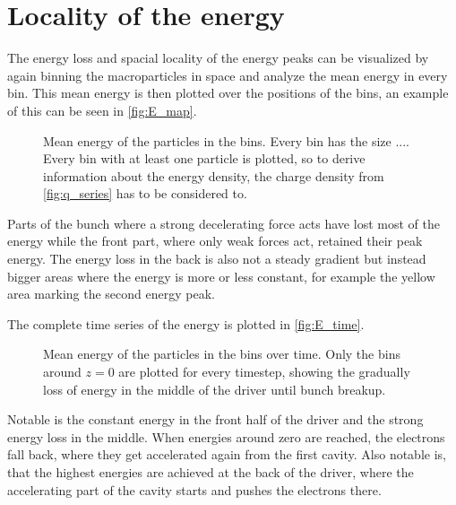 \documentclass[bachelor_thesis]{subfiles}
\begin{document}
\section{Locality of the energy}\label{chap:loc_E}
The energy loss and spacial locality of the energy peaks can be visualized by again binning the macroparticles in space and analyze the mean energy in every bin. This mean energy is then plotted over the positions of the bins,
an example of this can be seen in \autoref{fig:E_map}. 
\begin{figure}
	\centering
	\missingfigure{}
	\caption{Mean energy of the particles in the bins. Every bin has the size .... Every bin with at least one particle is plotted, so to derive information about the energy density, the charge density from \autoref{fig:q_series} has to be considered to.}
	\label{fig:E_map}
\end{figure}

Parts of the bunch where a strong decelerating force acts have lost most of the energy while the front part, where only weak forces act, retained their peak energy. The energy loss in the back is also not a steady gradient but instead bigger areas where the energy is more or less constant, 
for example the yellow area marking the second energy peak.

The complete time series of the energy is plotted in \autoref{fig:E_time}.
\begin{figure}
	\centering
	\missingfigure{}
	\caption{Mean energy of the particles in the bins over time. Only the bins around $z=0$ are plotted for every timestep, showing the gradually loss of energy in the middle of the driver until bunch breakup.}
	\label{fig:E_time}
\end{figure}
Notable is the constant energy in the front half of the driver and the strong energy loss in the middle. When energies around zero are reached, the electrons fall back, where they get accelerated again from the first cavity.
Also notable is, that the highest energies are achieved at the back of the driver, where the accelerating part of the cavity starts and pushes the electrons there.
\end{document}
